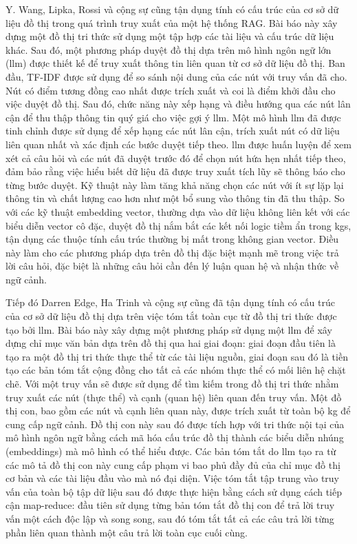 Y. Wang, Lipka, Rossi và cộng sự \cite{wang2024knowledge} cũng tận dụng tính có cấu trúc của cơ sở dữ liệu đồ thị trong quá trình truy xuất của một hệ thống RAG. Bài báo này xây dựng một đồ thị tri thức sử dụng một tập hợp các tài liệu và cấu trúc dữ liệu khác. Sau đó, một phương pháp duyệt đồ thị dựa trên mô hình ngôn ngữ lớn (\gls{llm}) được thiết kế để truy xuất thông tin liên quan từ cơ sở dữ liệu đồ thị. Ban đầu, TF-IDF được sử dụng để so sánh nội dung của các nút với truy vấn đã cho. Nút có điểm tương đồng cao nhất được trích xuất và coi là điểm khởi đầu cho việc duyệt đồ thị. Sau đó, chức năng này xếp hạng và điều hướng qua các nút lân cận để thu thập thông tin quý giá cho việc gợi ý \gls{llm}. Một mô hình \gls{llm} đã được tinh chỉnh được sử dụng để xếp hạng các nút lân cận, trích xuất nút có dữ liệu liên quan nhất và xác định các bước duyệt tiếp theo. \gls{llm} được huấn luyện để xem xét cả câu hỏi và các nút đã duyệt trước đó để chọn nút hứa hẹn nhất tiếp theo, đảm bảo rằng việc hiểu biết dữ liệu đã được truy xuất tích lũy sẽ thông báo cho từng bước duyệt. Kỹ thuật này làm tăng khả năng chọn các nút với ít sự lặp lại thông tin và chất lượng cao hơn như một bổ sung vào thông tin đã thu thập. So với các kỹ thuật embedding vector, thường dựa vào dữ liệu không liên kết với các biểu diễn vector cô đặc, duyệt đồ thị nắm bắt các kết nối logic tiềm ẩn trong \gls{kg}s, tận dụng các thuộc tính cấu trúc thường bị mất trong không gian vector. Điều này làm cho các phương pháp dựa trên đồ thị đặc biệt mạnh mẽ trong việc trả lời câu hỏi, đặc biệt là những câu hỏi cần đến lý luận quan hệ và nhận thức về ngữ cảnh.


Tiếp đó Darren Edge, Ha Trinh và cộng sự \cite{microsoftGraphRAG} cũng đã tận dụng tính có cấu trúc của cơ sở dữ liệu đồ thị dựa trên việc tóm tắt toàn cục từ đồ thị tri thức được tạo bởi \gls{llm}. Bài báo này xây dựng một phương pháp sử dụng một \gls{llm} để xây dựng chỉ mục văn bản dựa trên đồ thị qua hai giai đoạn: giai đoạn đầu tiên là tạo ra một đồ thị tri thức thực thể từ các tài liệu nguồn, giai đoạn sau đó là tiền tạo các bản tóm tắt cộng đồng cho tất cả các nhóm thực thể có mối liên hệ chặt chẽ. Với một truy vấn sẽ được sử dụng để tìm kiếm trong đồ thị tri thức nhằm truy xuất các nút (thực thể) và cạnh (quan hệ) liên quan đến truy vấn. Một đồ thị con, bao gồm các nút và cạnh liên quan này, được trích xuất từ toàn bộ \gls{kg} để cung cấp ngữ cảnh. Đồ thị con này sau đó được tích hợp với tri thức nội tại của mô hình ngôn ngữ bằng cách mã hóa cấu trúc đồ thị thành các biểu diễn nhúng (embeddings) mà mô hình có thể hiểu được. Các bản tóm tắt do \gls{llm} tạo ra từ các mô tả đồ thị con này cung cấp phạm vi bao phủ đầy đủ của chỉ mục đồ thị cơ bản và các tài liệu đầu vào mà nó đại diện. Việc tóm tắt tập trung vào truy vấn của toàn bộ tập dữ liệu sau đó được thực hiện bằng cách sử dụng cách tiếp cận map-reduce: đầu tiên sử dụng từng bản tóm tắt đồ thị con để trả lời truy vấn một cách độc lập và song song, sau đó tóm tắt tất cả các câu trả lời từng phần liên quan thành một câu trả lời toàn cục cuối cùng.


